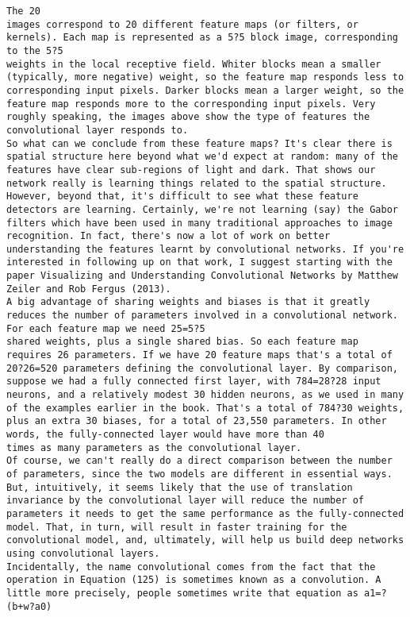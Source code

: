 \begin{lstlisting}
The 20
images correspond to 20 different feature maps (or filters, or kernels). Each map is represented as a 5?5 block image, corresponding to the 5?5
weights in the local receptive field. Whiter blocks mean a smaller (typically, more negative) weight, so the feature map responds less to corresponding input pixels. Darker blocks mean a larger weight, so the feature map responds more to the corresponding input pixels. Very roughly speaking, the images above show the type of features the convolutional layer responds to.
So what can we conclude from these feature maps? It's clear there is spatial structure here beyond what we'd expect at random: many of the features have clear sub-regions of light and dark. That shows our network really is learning things related to the spatial structure. However, beyond that, it's difficult to see what these feature detectors are learning. Certainly, we're not learning (say) the Gabor filters which have been used in many traditional approaches to image recognition. In fact, there's now a lot of work on better understanding the features learnt by convolutional networks. If you're interested in following up on that work, I suggest starting with the paper Visualizing and Understanding Convolutional Networks by Matthew Zeiler and Rob Fergus (2013).
A big advantage of sharing weights and biases is that it greatly reduces the number of parameters involved in a convolutional network. For each feature map we need 25=5?5
shared weights, plus a single shared bias. So each feature map requires 26 parameters. If we have 20 feature maps that's a total of 20?26=520 parameters defining the convolutional layer. By comparison, suppose we had a fully connected first layer, with 784=28?28 input neurons, and a relatively modest 30 hidden neurons, as we used in many of the examples earlier in the book. That's a total of 784?30 weights, plus an extra 30 biases, for a total of 23,550 parameters. In other words, the fully-connected layer would have more than 40
times as many parameters as the convolutional layer.
Of course, we can't really do a direct comparison between the number of parameters, since the two models are different in essential ways. But, intuitively, it seems likely that the use of translation invariance by the convolutional layer will reduce the number of parameters it needs to get the same performance as the fully-connected model. That, in turn, will result in faster training for the convolutional model, and, ultimately, will help us build deep networks using convolutional layers.
Incidentally, the name convolutional comes from the fact that the operation in Equation (125) is sometimes known as a convolution. A little more precisely, people sometimes write that equation as a1=?(b+w?a0)

\end{lstlisting}

